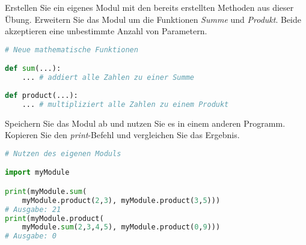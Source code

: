 Erstellen Sie ein eigenes Modul mit den bereits erstellten Methoden aus dieser Übung. Erweitern Sie das Modul um die Funktionen \emph{Summe} und \emph{Produkt}. Beide akzeptieren eine unbestimmte Anzahl von Parametern. 

\begin{lstlisting}[language=Python]
# Neue mathematische Funktionen

def sum(...):
	... # addiert alle Zahlen zu einer Summe
	
def product(...):
	... # multipliziert alle Zahlen zu einem Produkt
\end{lstlisting}

Speichern Sie das Modul ab und nutzen Sie es in einem anderen Programm. Kopieren Sie den \emph{print}-Befehl und vergleichen Sie das Ergebnis.

\begin{lstlisting}[language=Python]
# Nutzen des eigenen Moduls

import myModule

print(myModule.sum(
	myModule.product(2,3), myModule.product(3,5)))
# Ausgabe: 21
print(myModule.product(
	myModule.sum(2,3,4,5), myModule.product(0,9)))
# Ausgabe: 0

\end{lstlisting}

